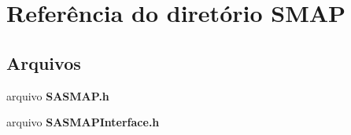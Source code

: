\section{Referência do diretório S\+M\+AP}
\label{dir_25d1fe076302781507c0ca0692876162}
\subsection*{Arquivos}
\begin{DoxyCompactItemize}
\item 
arquivo {\bf S\+A\+S\+M\+A\+P.\+h}
\item 
arquivo {\bf S\+A\+S\+M\+A\+P\+Interface.\+h}
\end{DoxyCompactItemize}
